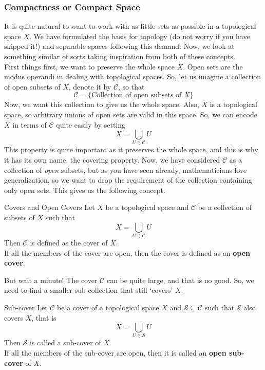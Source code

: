 \subsubsection{Compactness or Compact Space}
It is quite natural to want to work with as little sets as possible in a topological space $X$. We have formulated the basis for topology (do not worry if you have skipped it!) and separable spaces following this demand. Now, we look at something similar of sorts taking inspiration from both of these concepts. \\
First things first, we want to preserve the whole space $X$. Open sets are the modus operandi in dealing with topological spaces. So, let us imagine a collection of open subsets of $X$, denote it by $\mathcal{C}$, so that $$\mathcal{C}=\{\text{Collection of open subsets of }X\}$$ Now, we want this collection to give us the whole space. Also, $X$ is a topological space, so arbitrary unions of open sets are valid in this space. So, we can encode $X$ in terms of $\mathcal{C}$ quite easily by setting $$X=\bigcup_{U\in \mathcal{C}}U$$ This property is quite important as it preserves the whole space, and this is why it has its own name, the covering property. Now, we have considered $\mathcal{C}$ as a collection of \textit{open} subsets, but as you have seen already, mathematicians love generalization, so we want to drop the requirement of the collection containing only open sets. This gives us the following concept. 
\begin{Definition}{Covers and Open Covers}\label{cover_and_open_cover}
    Let $X$ be a topological space and $\mathcal{C}$ be a collection of subsets of $X$ such that $$X=\bigcup_{U\in \mathcal{C}}U$$Then $\mathcal{C}$ is defined as the cover of $X$.\\
    If all the members of the cover are open, then the cover is defined as an \textbf{open cover}.
\end{Definition}
\noindent But wait a minute! The cover $\mathcal{C}$ can be quite large, and that is no good. So, we need to find a smaller sub-collection that still `covers' $X$.
\begin{Definition}{Sub-cover}\label{sub-cover}
    Let $\mathcal{C}$ be a cover of a topological space $X$ and $\mathcal{S\subseteq C}$ such that $\mathcal{S}$ also covers $X$, that is $$X=\bigcup_{U\in \mathcal{S}}U$$ Then $\mathcal{S}$ is called a sub-cover of $X$. \\
    If all the members of the sub-cover are open, then it is called an \textbf{open sub-cover} of $X$.
\end{Definition}
